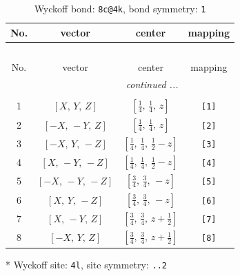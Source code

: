 \documentclass[fleqn,8pt]{jsarticle}
\begin{document}
\renewcommand{\arraystretch}{1.2}
\begin{longtable}{cccc}
\caption{Wyckoff bond: {\tt 8c@4k}, bond symmetry: {\tt 1}}
 \\
 \hline \hline
No. & vector & center & mapping \\ \hline \endfirsthead

\multicolumn{3}{l}{\tablename\ \thetable{}} \\
 \hline \hline
No. & vector & center & mapping \\ \hline \endhead

 \hline \hline
\multicolumn{3}{r}{\footnotesize\it continued ...} \\ \endfoot

 \hline \hline
\multicolumn{3}{r}{} \\ \endlastfoot

1 & $\left[ X,\, Y,\, Z \right]$ & $\left[ \frac{1}{4},\, \frac{1}{4},\, z \right]$ & {\tt [1]} \\ \hline
2 & $\left[ - X,\, - Y,\, Z \right]$ & $\left[ \frac{1}{4},\, \frac{1}{4},\, z \right]$ & {\tt [2]} \\ \hline
3 & $\left[ - X,\, Y,\, - Z \right]$ & $\left[ \frac{1}{4},\, \frac{1}{4},\, \frac{1}{2} - z \right]$ & {\tt [3]} \\ \hline
4 & $\left[ X,\, - Y,\, - Z \right]$ & $\left[ \frac{1}{4},\, \frac{1}{4},\, \frac{1}{2} - z \right]$ & {\tt [4]} \\ \hline
5 & $\left[ - X,\, - Y,\, - Z \right]$ & $\left[ \frac{3}{4},\, \frac{3}{4},\, - z \right]$ & {\tt [5]} \\ \hline
6 & $\left[ X,\, Y,\, - Z \right]$ & $\left[ \frac{3}{4},\, \frac{3}{4},\, - z \right]$ & {\tt [6]} \\ \hline
7 & $\left[ X,\, - Y,\, Z \right]$ & $\left[ \frac{3}{4},\, \frac{3}{4},\, z + \frac{1}{2} \right]$ & {\tt [7]} \\ \hline
8 & $\left[ - X,\, Y,\, Z \right]$ & $\left[ \frac{3}{4},\, \frac{3}{4},\, z + \frac{1}{2} \right]$ & {\tt [8]} \\
\end{longtable}
* Wyckoff site: {\tt 4l}, site symmetry: {\tt ..2}
\renewcommand{\arraystretch}{1.2}
\end{document}
